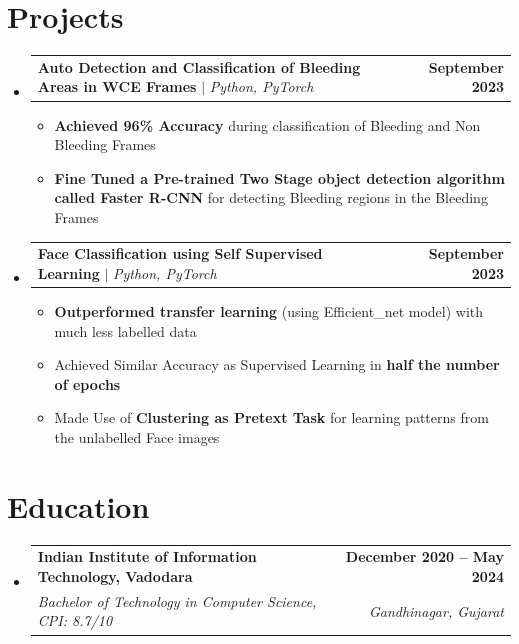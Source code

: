 \documentclass[letterpaper,11pt]{article}
\makeatletter
\newcommand{\resumeItem}[1]{
  \item\small{
    {#1 \vspace{-2pt}}
  }
}
\newcommand{\resumeSubheading}[4]{
  \vspace{-2pt}\item
    \begin{tabular*}{1.0\textwidth}[t]{l@{\extracolsep{\fill}}r}
      \textbf{#1} & \textbf{\small #2} \\
      \textit{\small#3} & \textit{\small #4} \\
    \end{tabular*}\vspace{-7pt}
}
\newcommand{\resumeProjectHeading}[2]{
    \item
    \begin{tabular*}{1.001\textwidth}{l@{\extracolsep{\fill}}r}
      \small#1 & \textbf{\small #2}\\
    \end{tabular*}\vspace{-7pt}
}
\newcommand{\resumeSubHeadingListStart}{\begin{itemize}[leftmargin=0.0in, label={}]}
\newcommand{\resumeSubHeadingListEnd}{\end{itemize}}
\newcommand{\resumeItemListStart}{\begin{itemize}}
\newcommand{\resumeItemListEnd}{\end{itemize}\vspace{-5pt}}
\makeatother
\begin{document}
\section{Projects}
    \vspace{-5pt}
    \resumeSubHeadingListStart
      \resumeProjectHeading
          {\textbf{Auto Detection and Classification of Bleeding Areas in WCE Frames} $|$ \emph{Python, PyTorch}}{September 2023}
          \resumeItemListStart
            \resumeItem{\textbf{Achieved 96\% Accuracy} during classification of Bleeding and Non Bleeding Frames}
            \resumeItem{\textbf{Fine Tuned a Pre-trained Two Stage object detection algorithm called Faster R-CNN} for detecting Bleeding regions in the Bleeding Frames}
          \resumeItemListEnd 
          \vspace{-13pt}
      \resumeProjectHeading
          {\textbf{Face Classification using Self Supervised Learning} $|$ \emph{Python, PyTorch}}{September 2023}
          \resumeItemListStart
            \resumeItem{\textbf{Outperformed transfer learning} (using Efficient\_net model) with much less labelled data}
            \resumeItem{Achieved Similar Accuracy as Supervised Learning in \textbf{half the number of epochs}}
            \resumeItem{Made Use of \textbf{Clustering as Pretext Task} for learning patterns from the unlabelled Face images}
          \resumeItemListEnd 


    \resumeSubHeadingListEnd
\vspace{-15pt}

\section{Education}
  \resumeSubHeadingListStart
 \resumeSubheading
      {Indian Institute of Information Technology, Vadodara}{December 2020 -- May 2024}
      {Bachelor of Technology in Computer Science, CPI: 8.7/10} {Gandhinagar, Gujarat}
  \resumeSubHeadingListEnd
\end{document}
